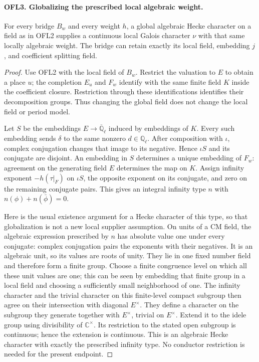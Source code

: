\paragraph{OFL3. Globalizing the prescribed local algebraic weight.}
\label{claim:OFL3}
For every bridge \(B_w\) and every weight \(h\), a global
algebraic Hecke character on a field as in OFL2 supplies a continuous
local Galois character \(\nu\) with that same locally algebraic
weight.  The bridge can retain exactly its local field, embedding
\(j\), and coefficient splitting field.
\begin{proof}
Use OFL2 with the local field of \(B_w\).  Restrict the valuation
to \(E\) to obtain a place \(u\); the completion \(E_u\)
and \(F_w\) identify with the same finite field \(K\) inside
the coefficient closure.  Restriction through these identifications
identifies their decomposition groups.  Thus changing the global
field does not change the local field or period model.

Let \(S\) be the embeddings \(E\to\overline{\mathbb Q}_\ell\)
induced by embeddings of \(K\).  Every such embedding sends
\(\delta\) to the same nonzero \(d\in\mathbb Q_\ell\).
After composition with \(\iota\), complex conjugation changes
that image to its negative.  Hence \(\iota S\) and its conjugate
are disjoint.  An embedding in \(S\) determines a unique embedding
of \(F_w\): agreement on the generating field \(E\) determines
the map on \(K\).  Assign infinity exponent \(-h(\tau|_F)\)
on \(\iota S\), the opposite exponent on its conjugate, and
zero on the remaining conjugate pairs.  This gives an integral
infinity type \(n\) with \(n(\phi)+n(\bar\phi)=0\).

Here is the usual existence argument for a Hecke character of this
type, so that globalization is not a new local supplier assumption.
On units of a CM field, the algebraic expression prescribed by
\(n\) has absolute value one under every conjugate: complex
conjugation pairs the exponents with their negatives.  It is an
algebraic unit, so its values are roots of unity.  They lie in one
fixed number field and therefore form a finite group.  Choose a
finite congruence level on which all these unit values are one;
this can be seen by embedding that finite group in a local field
and choosing a sufficiently small neighborhood of one.  The
infinity character and the trivial character on this finite-level
compact subgroup then agree on their intersection with diagonal
\(E^\times\).  They define a character on the subgroup they
generate together with \(E^\times\), trivial on \(E^\times\).
Extend it to the idele group using divisibility of \(\mathbb C^\times\).
Its restriction to the stated open subgroup is continuous; hence
the extension is continuous.  This is an algebraic Hecke character
with exactly the prescribed infinity type.  No conductor restriction
is needed for the present endpoint.


\end{proof}
